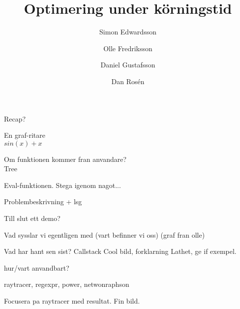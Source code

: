 \documentclass{beamer}
\begin{document}
\title{Optimering under körningstid}


\author{Simon Edwardsson \and Olle Fredriksson
\and \linebreak{}
Daniel Gustafsson \and Dan Rosén}



\begin{frame}
    \titlepage
\end{frame}

\begin{frame}

	Recap?

\end{frame}

\begin{frame}


	En graf-ritare\\
	\pause
	$sin(x) + x$
	
	Om funktionen kommer fran anvandare?\\
	\pause
	Tree

	\pause
	Eval-funktionen.
	Stega igenom nagot...
	
	\pause
	Problembeskrivning + lsg

	\pause
	Till slut ett demo?

\end{frame}

\begin{frame}

	Vad sysslar vi egentligen med (vart befinner vi oss) (graf fran olle)

\end{frame}

\begin{frame}
	Vad har hant sen sist?
	\pause
	Callstack
		Cool bild, forklarning
	\pause 
	Lathet, ge if exempel.
\end{frame}

\begin{frame}
	hur/vart anvandbart?
	
	raytracer, regexpr, power, netwonraphson
\end{frame}

\begin{frame}
	Focusera pa raytracer med resultat.
	Fin bild.
\end{frame}
\end{document}
